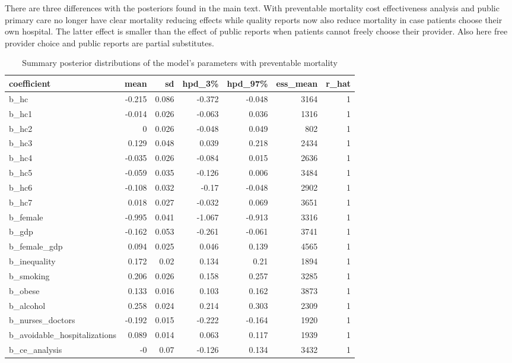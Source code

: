 \documentclass[a4paper,12pt]{article}
\begin{document}
There are three differences with the posteriors found in the main text. With preventable mortality cost effectiveness analysis and public primary care no longer have clear mortality reducing effects while quality reports now also reduce mortality in case patients choose their own hospital. The latter effect is smaller than the effect of public reports when patients cannot freely choose their provider. Also here free provider choice and public reports are partial substitutes.

\begin{table}[htbp]
\caption{\label{tab:posterior_prevetable}Summary posterior distributions of the model's parameters with preventable mortality}
\centering
\begin{tabular}{lrrrrrr}
coefficient & mean & sd & hpd\_3\% & hpd\_97\% & ess\_mean & r\_hat\\
\hline
b\_hc & -0.215 & 0.086 & -0.372 & -0.048 & 3164 & 1\\
b\_hc1 & -0.014 & 0.026 & -0.063 & 0.036 & 1316 & 1\\
b\_hc2 & 0 & 0.026 & -0.048 & 0.049 & 802 & 1\\
b\_hc3 & 0.129 & 0.048 & 0.039 & 0.218 & 2434 & 1\\
b\_hc4 & -0.035 & 0.026 & -0.084 & 0.015 & 2636 & 1\\
b\_hc5 & -0.059 & 0.035 & -0.126 & 0.006 & 3484 & 1\\
b\_hc6 & -0.108 & 0.032 & -0.17 & -0.048 & 2902 & 1\\
b\_hc7 & 0.018 & 0.027 & -0.032 & 0.069 & 3651 & 1\\
b\_female & -0.995 & 0.041 & -1.067 & -0.913 & 3316 & 1\\
b\_gdp & -0.162 & 0.053 & -0.261 & -0.061 & 3741 & 1\\
b\_female\_gdp & 0.094 & 0.025 & 0.046 & 0.139 & 4565 & 1\\
b\_inequality & 0.172 & 0.02 & 0.134 & 0.21 & 1894 & 1\\
b\_smoking & 0.206 & 0.026 & 0.158 & 0.257 & 3285 & 1\\
b\_obese & 0.133 & 0.016 & 0.103 & 0.162 & 3873 & 1\\
b\_alcohol & 0.258 & 0.024 & 0.214 & 0.303 & 2309 & 1\\
b\_nurses\_doctors & -0.192 & 0.015 & -0.222 & -0.164 & 1920 & 1\\
b\_avoidable\_hospitalizations & 0.089 & 0.014 & 0.063 & 0.117 & 1939 & 1\\
b\_ce\_analysis & -0 & 0.07 & -0.126 & 0.134 & 3432 & 1\\

\end{tabular}
\end{table}
\end{document}
